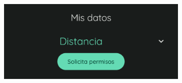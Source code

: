             \begin{figure}[htbp]
                \centering
                \begin{subfigure}[c]{0.27\textwidth}
                    \centering
                    \includegraphics[width=1\textwidth]{figures/pruebas/local_wearable/Distancia sin permiso.png}
                \end{subfigure}
                \hspace{0.1\textwidth}
                \begin{subfigure}[c]{0.27\textwidth}
                    \centering

\end{subfigure}
\end{figure}
